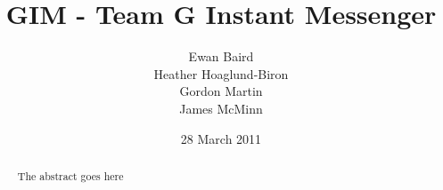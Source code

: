 \documentclass{l3proj}
\begin{document}
\title{GIM - Team G Instant Messenger}
\author{Ewan Baird \\
Heather Hoaglund-Biron \\
Gordon Martin \\
James McMinn}
\date{28 March 2011}
\maketitle
\begin{abstract}

The abstract goes here

\end{abstract}
\educationalconsent
\tableofcontents















\end{document}
